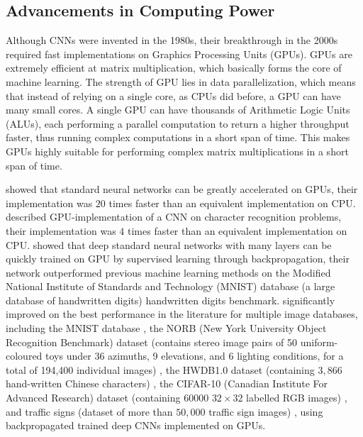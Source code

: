 \documentclass[12pt]{report}
\numberwithin{equation}{section}
\begin{document}
\subsection{Advancements in Computing Power}
Although CNNs were invented in the 1980s, their breakthrough in the 2000s required fast implementations on Graphics Processing Units (GPUs). GPUs are extremely efficient at matrix multiplication, which basically forms the core of machine learning. The strength of GPU lies in data parallelization, which means that instead of relying on a single core, as CPUs did before, a GPU can have many small cores. A single GPU can have thousands of Arithmetic Logic Units (ALUs), each performing a parallel computation to return a higher throughput faster, thus running complex computations in a short span of time. This makes GPUs highly suitable for performing complex matrix multiplications in a short span of time.

{\cite{gpu2004}}  showed that standard neural networks can be greatly accelerated on GPUs, their implementation was $20$ times faster than an equivalent implementation on CPU. {\cite{chellapilla:inria-00112631}} described GPU-implementation of a CNN on character recognition problems, their implementation was $4$ times faster than an equivalent implementation on CPU. {\cite{10.1162/NECO_a_00052}} showed that deep standard neural networks with many layers can be quickly trained on GPU by supervised learning through  backpropagation, their network outperformed previous machine learning methods on the Modified National Institute of Standards and Technology (MNIST) database (a large database of handwritten digits) handwritten digits benchmark. {\cite{Ciresan12multi-columndeep}} significantly improved on the best performance in the literature for multiple image databases, including the MNIST database {\cite{LeCun:89}}, the NORB (New York University Object Recognition Benchmark) dataset  (contains stereo image pairs of 50 uniform-coloured toys under 36 azimuths, 9 elevations, and 6 lighting conditions, for a total of 194,400 individual images) {\cite{10.5555/1896300.1896315}}, the HWDB1.0 dataset (containing $3,866$ hand-written Chinese characters) {\cite{icdar2011Chinese}}, the CIFAR-10 (Canadian Institute For Advanced Research) dataset (containing $60000$ $32 \times 32$ labelled RGB images) {\cite{krizhevsky2009learning}}, and traffic signs (dataset of more than $50,000$ traffic sign images) {\cite{stallkamp:11}}, using backpropagated trained deep CNNs implemented on GPUs.
\end{document}
